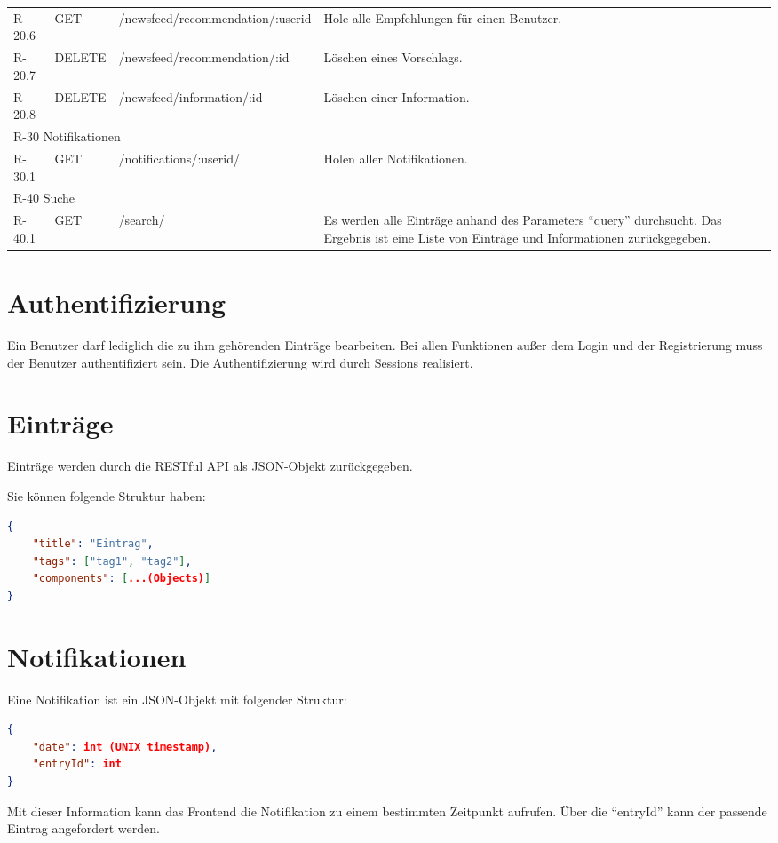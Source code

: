 \begin{tabularx}{\textwidth}{|l|l|l|X|}
    R-20.6 & GET & /newsfeed/recommendation/:userid & Hole alle Empfehlungen für einen Benutzer. \\

    R-20.7 & DELETE & /newsfeed/recommendation/:id & Löschen eines Vorschlags.\\
    R-20.8 & DELETE & /newsfeed/information/:id & Löschen einer Information.\\
    \hline
    \multicolumn{4}{|l|}{R-30 Notifikationen}\\
    \hline
    R-30.1 & GET & /notifications/:userid/ & Holen aller Notifikationen.\\ 

    \hline
    \multicolumn{4}{|l|}{R-40 Suche}\\
    \hline
    R-40.1 & GET & /search/ & Es werden alle Einträge anhand des Parameters \enquote{query} durchsucht.
                                Das Ergebnis ist eine Liste von Einträge und Informationen zurückgegeben.\\

\end{tabularx}

\section{Authentifizierung}
Ein Benutzer darf lediglich die zu ihm gehörenden Einträge bearbeiten. 
Bei allen Funktionen außer dem Login und der Registrierung muss der Benutzer authentifiziert sein.
Die Authentifizierung wird durch Sessions realisiert.

\section{Einträge}
Einträge werden durch die RESTful API als JSON-Objekt zurückgegeben.

Sie können folgende Struktur haben:

\begin{lstlisting}[language=JSON]
{
    "title": "Eintrag",
    "tags": ["tag1", "tag2"],
    "components": [...(Objects)]
}
\end{lstlisting}

\section{Notifikationen}
Eine Notifikation ist ein JSON-Objekt mit folgender Struktur:

\begin{lstlisting}[language=JSON]
{
    "date": int (UNIX timestamp),
    "entryId": int
}
\end{lstlisting}

Mit dieser Information kann das Frontend die Notifikation zu einem bestimmten Zeitpunkt aufrufen. Über die \enquote{entryId} kann der passende Eintrag angefordert werden.

